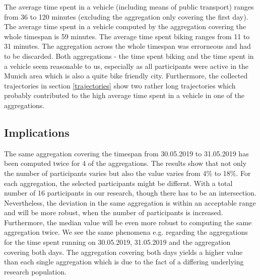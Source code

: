 The average time spent in a vehicle (including means of public transport) ranges from 36 to 120 minutes (excluding the aggregation only covering the first day). The average time spent in a vehicle computed by the aggregation covering the whole timespan is 59 minutes.
The average time spent biking ranges from 11 to 31 minutes. The aggregation across the whole timespan was errorneous and had to be discarded. Both aggregations - the time spent biking and the time spent in a vehicle seem reasonable to us, especially as all participants were active in the Munich area which is also a quite bike friendly city. Furthermore, the collected trajectories in section \ref{trajectories} show two rather long trajectories which probably contributed to the high average time spent in a vehicle in one of the aggregations.

\subsection{Implications}
The same aggregation covering the timespan from 30.05.2019 to 31.05.2019 has been computed twice for 4 of the aggregations. The results show that not only the number of participants varies but also the value varies from 4\% to 18\%. For each aggregation, the selected participants might be differnt. With a total number of 16 participants in our research, though there has to be an intersection. Nevertheless, the deviation in the same aggregation is within an acceptable range and will be more robust, when the number of participants is increased. Furthermore, the median value will be even more robust to computing the same aggregation twice. We see the same phenomena e.g. regarding the aggregations for the time spent running on 30.05.2019, 31.05.2019 and the aggregation covering both days. The aggregation covering both days yields a higher value than each single aggregation which is due to the fact of a differing underlying research population.


